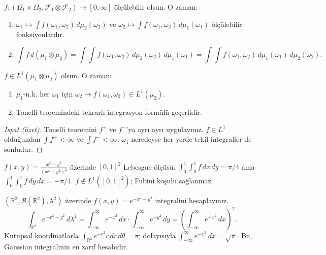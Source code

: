 \begin{teorem}\label{thm:tonelli}
$f: (\Omega_1 \times \Omega_2, \mathcal{F}_1 \otimes \mathcal{F}_2) \to [0,\infty]$
ölçülebilir olsun. O zaman:
\begin{enumerate}[label=(\roman*)]
  \item $\omega_1 \mapsto \int f(\omega_1, \omega_2) \, d\mu_2(\omega_2)$ ve
        $\omega_2 \mapsto \int f(\omega_1, \omega_2) \, d\mu_1(\omega_1)$
        ölçülebilir fonksiyonlardır.
  \item
        \[
          \int f \, d(\mu_1 \otimes \mu_2)
          = \int\!\!\int f(\omega_1,\omega_2) \, d\mu_2(\omega_2) \, d\mu_1(\omega_1)
          = \int\!\!\int f(\omega_1,\omega_2) \, d\mu_1(\omega_1) \, d\mu_2(\omega_2).
        \]
\end{enumerate}
\end{teorem}

\begin{teorem}\label{thm:fubini}
$f \in L^1(\mu_1 \otimes \mu_2)$ olsun. O zaman:
\begin{enumerate}[label=(\roman*)]
  \item $\mu_1$-n.k. her $\omega_1$ için $\omega_2 \mapsto f(\omega_1, \omega_2) \in L^1(\mu_2)$.
  \item Tonelli teoremindeki tekrarlı integrasyon formülü geçerlidir.
\end{enumerate}
\end{teorem}

\begin{proof}[İspat (özet)]
Tonelli teoremini $f^+$ ve $f^-$'ya ayrı ayrı uygulayınız.
$f \in L^1$ olduğundan $\int f^+ < \infty$ ve $\int f^- < \infty$;
$\omega_1$-neredeyse her yerde tekil integraller de sonludur.
\end{proof}

\begin{hataanalizi}
$f(x,y) = \frac{x^2 - y^2}{(x^2+y^2)^2}$ üzerinde $[0,1]^2$ Lebesgue ölçüsü.
$\int_0^1 \int_0^1 f \, dx \, dy = \pi/4$ ama $\int_0^1 \int_0^1 f \, dy \, dx = -\pi/4$.
$f \notin L^1([0,1]^2)$; Fubini koşulu sağlanmaz.
\end{hataanalizi}

\begin{ornek}
$(\mathbb{R}^2, \mathcal{B}(\mathbb{R}^2), \lambda^2)$ üzerinde
$f(x,y) = e^{-x^2 - y^2}$ integralini hesaplayınız.
\[
  \int_{\mathbb{R}^2} e^{-x^2-y^2} \, d\lambda^2
  = \int_{-\infty}^\infty e^{-x^2} \, dx \cdot \int_{-\infty}^\infty e^{-y^2} \, dy
  = \left(\int_{-\infty}^\infty e^{-x^2} \, dx\right)^{\!2}.
\]
Kutupsal koordinatlarla $\int_{\mathbb{R}^2} e^{-r^2} r \, dr \, d\theta = \pi$;
dolayısıyla $\int_{-\infty}^\infty e^{-x^2} \, dx = \sqrt{\pi}$.
Bu, Gaussian integralinin en zarif hesabıdır.
\end{ornek}

